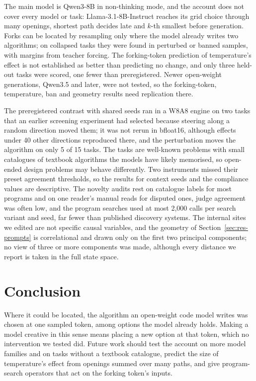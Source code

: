 \documentclass[11pt,letterpaper]{article}
\begin{document}
The main model is Qwen3-8B in non-thinking mode, and the account does not cover every model or task: Llama-3.1-8B-Instruct reaches its grid choice through many openings, shortest path decides late and $k$-th smallest before generation. Forks can be located by resampling only where the model already writes two algorithms; on collapsed tasks they were found in perturbed or banned samples, with margins from teacher forcing. The forking-token prediction of temperature's effect is not established as better than predicting no change, and only three held-out tasks were scored, one fewer than preregistered. Newer open-weight generations, Qwen3.5 and later, were not tested, so the forking-token, temperature, ban and geometry results need replication there.

The preregistered contrast with shared seeds ran in a W8A8 engine on two tasks that an earlier screening experiment had selected because steering along a random direction moved them; it was not rerun in bfloat16, although effects under 40 other directions reproduced there, and the perturbation moves the algorithm on only 5 of 15 tasks. The tasks are well-known problems with small catalogues of textbook algorithms the models have likely memorised, so open-ended design problems may behave differently. Two instruments missed their preset agreement thresholds, so the results for context seeds and the compliance values are descriptive. The novelty audits rest on catalogue labels for most programs and on one reader's manual reads for disputed ones, judge agreement was often low, and the program searches used at most 2,000 calls per search variant and seed, far fewer than published discovery systems. The internal sites we edited are not specific causal variables, and the geometry of Section~\ref{sec:res-prompts} is correlational and drawn only on the first two principal components; no view of three or more components was made, although every distance we report is taken in the full state space.

\section{Conclusion}
\label{sec:conclusion}

Where it could be located, the algorithm an open-weight code model writes was chosen at one sampled token, among options the model already holds. Making a model creative in this sense means placing a new option at that token, which no intervention we tested did. Future work should test the account on more model families and on tasks without a textbook catalogue, predict the size of temperature's effect from openings summed over many paths, and give program-search operators that act on the forking token's inputs.
\end{document}

